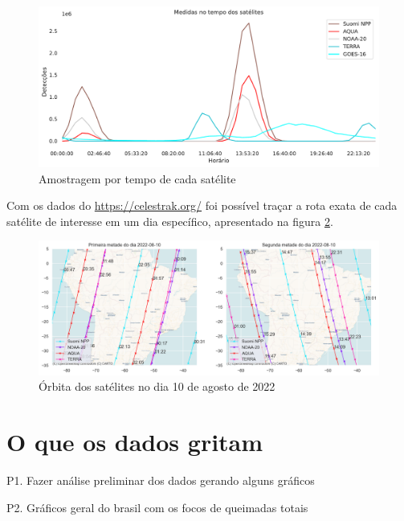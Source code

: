 \documentclass[cic,tc]{iiufrgs}
\begin{document}
\begin{figure}
    \caption{Amostragem por tempo de cada satélite}
    \begin{center}
        \includegraphics[width=35em]{tempo_medidas_satelites}
    \end{center}
    \label{fig:tempo_medidas_satelites}
\end{figure}

Com os dados do \url{https://celestrak.org/} foi possível traçar a rota 
exata de cada satélite de interesse em um dia específico, apresentado na figura 
\ref{fig:orbita2022-08-10}. 
\par

\begin{figure}
    \caption{Órbita dos satélites no dia 10 de agosto de 2022}
    \begin{center}
        \includegraphics[width=35em]{orbita2022-08-10}
    \end{center}
    \label{fig:orbita2022-08-10}
\end{figure}

\section{O que os dados gritam}

P1. Fazer análise preliminar dos dados gerando alguns gráficos \par
P2. Gráficos geral do brasil com os focos de queimadas totais \cite{geographicDataSciencePython} \par
\end{document}
